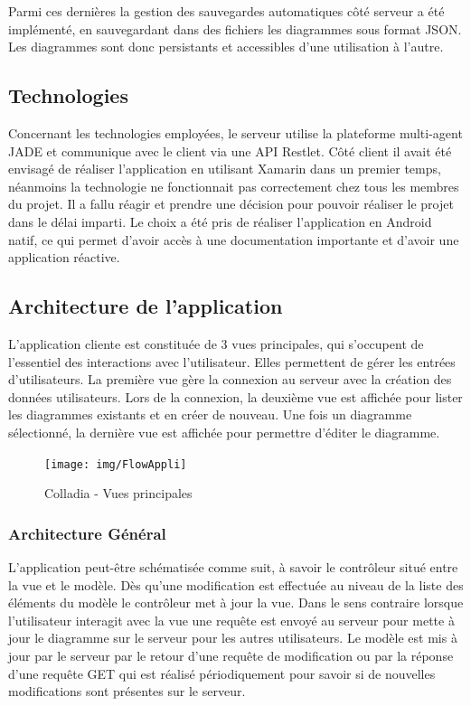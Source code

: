 Parmi ces dernières la gestion des sauvegardes automatiques côté serveur a été implémenté, en sauvegardant dans des fichiers les diagrammes sous format JSON. Les diagrammes sont donc persistants et accessibles d'une utilisation à l'autre.

\newpage
\subsection{Technologies}
Concernant les technologies employées, le serveur utilise la plateforme multi-agent JADE et communique avec le client via une API Restlet.
Côté client il avait été envisagé de réaliser l'application en utilisant Xamarin dans un premier temps, néanmoins la technologie ne fonctionnait pas correctement chez tous les membres du projet.
Il a fallu réagir et prendre une décision pour pouvoir réaliser le projet dans le délai imparti.
Le choix a été pris de réaliser l'application en Android natif, ce qui permet d'avoir accès à une documentation importante et d'avoir une application réactive.
\vspace*{-.5cm}

\subsection{Architecture de l'application}
L'application cliente est constituée de 3 vues principales, qui s'occupent de l'essentiel des interactions avec l'utilisateur.
Elles permettent de gérer les entrées d'utilisateurs.
La première vue gère la connexion au serveur avec la création des données utilisateurs. Lors de la connexion, la deuxième vue est affichée pour lister les diagrammes existants et en créer de nouveau.
Une fois un diagramme sélectionné, la dernière vue est affichée pour permettre d'éditer le diagramme. 
	
 	\vspace*{\fill}
	\begin{figure}[!h]
		\centering
		\texttt{[image: img/FlowAppli]}
		\caption{Colladia - Vues principales}
	\end{figure}
 	\vspace*{\fill}
\vspace*{-.5cm}

\subsubsection{Architecture Général}
L'application peut-être schématisée comme suit, à savoir le contrôleur situé entre la vue et le modèle. Dès qu'une modification est effectuée au niveau de la liste des éléments du modèle le contrôleur met à jour la vue.
Dans le sens contraire lorsque l'utilisateur interagit avec la vue une requête est envoyé au serveur pour mette à jour le diagramme sur le serveur pour les autres utilisateurs.
Le modèle est mis à jour par le serveur par le retour d'une requête de modification ou par la réponse d'une requête GET qui est réalisé périodiquement pour savoir si de nouvelles modifications sont présentes sur le serveur.


